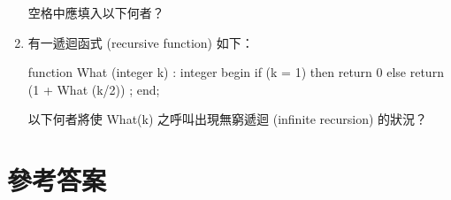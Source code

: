 \documentclass[12pt,a4paper]{report}
\begin{document}
\begin{CJK}{UTF8}{bkai}
\begin{enumerate}
空格中應填入以下何者？
\item 有一遞迴函式 (recursive function) 如下：

function What (integer k) : integer
begin
if (k = 1)
then return 0
else return (1 + What (k/2)) ;
end;

以下何者將使 What(k) 之呼叫出現無窮遞迴 (infinite recursion) 的狀況？
\end{enumerate}

\newpage

\section*{參考答案}


\end{CJK}
\end{document}
